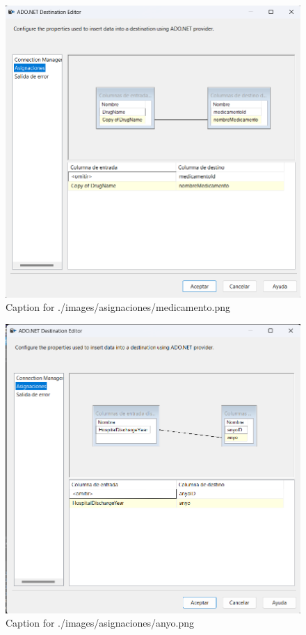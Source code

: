 \documentclass{article}
\begin{document}
\begin{figure}[H]
  \centering
  \includegraphics[width=\linewidth]{./images/asignaciones/medicamento.png}
  \caption{Caption for ./images/asignaciones/medicamento.png}
\end{figure}
\begin{figure}[H]
  \centering
  \includegraphics[width=\linewidth]{./images/asignaciones/anyo.png}
  \caption{Caption for ./images/asignaciones/anyo.png}
\end{figure}
\end{document}
